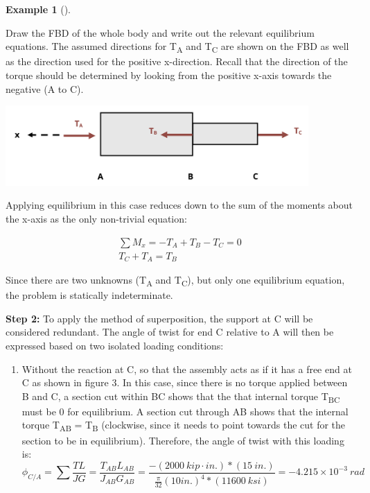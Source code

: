 \documentclass[
  letterpaper,
  DIV=11,
  numbers=noendperiod]{scrreprt}
\theoremstyle{definition}
\newtheorem{example}{Example}[chapter]
\theoremstyle{remark}
\begin{document}
\begin{tcolorbox}
\begin{example}[]
\begin{tcolorbox}
Draw the FBD of the whole body and write out the relevant equilibrium
equations. The assumed directions for T\textsubscript{A} and
T\textsubscript{C} are shown on the FBD as well as the direction used
for the positive x-direction. Recall that the direction of the torque
should be determined by looking from the positive x-axis towards the
negative (A to C).

\begin{center}
\includegraphics[width=4.55208in,height=\textheight]{images/CH6 PNGs/example 6.5 part 2.png}
\end{center}

Applying equilibrium in this case reduces down to the sum of the moments
about the x-axis as the only non-trivial equation:

\[
\begin{gathered}
\sum M_x=-T_A+T_B-T_C=0 \\
T_C+T_A=T_B
\end{gathered}
\]

Since there are two unknowns (T\textsubscript{A} and
T\textsubscript{C}), but only one equilibrium equation, the problem is
statically indeterminate.

\textbf{Step 2:} To apply the method of superposition, the support at C
will be considered redundant. The angle of twist for end C relative to A
will then be expressed based on two isolated loading conditions:

\begin{enumerate}
\def\labelenumi{\arabic{enumi}.}
\item
  Without the reaction at C, so that the assembly acts as if it has a
  free end at C as shown in figure 3. In this case, since there is no
  torque applied between B and C, a section cut within BC shows that the
  that internal torque T\textsubscript{BC} must be 0 for equilibrium. A
  section cut through AB shows that the internal torque
  T\textsubscript{AB} = T\textsubscript{B} (clockwise, since it needs to
  point towards the cut for the section to be in equilibrium).
  Therefore, the angle of twist with this loading is:\\
  \[
  \phi_{C/A}=\sum \frac{TL}{JG}=\frac{T_{AB}L_{AB}}{J_{AB} {G}_{AB}}=\frac{-(2000{~kip}\cdot{in.})*(15{~in.})}{\frac{\pi}{32}(10{in.})^4*(11600{~ksi})}=-4.215 \times 10^{-3}{~rad}
  \]


\end{enumerate}
\end{tcolorbox}
\end{example}
\end{tcolorbox}
\end{document}
